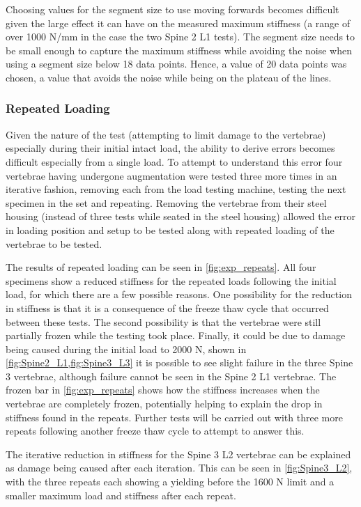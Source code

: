 Choosing values for the segment size to use moving forwards becomes difficult
given the large effect it can have on the measured maximum stiffness (a range of
over 1000 N/mm in the case the two Spine 2 L1 tests). The segment size needs to
be small enough to capture the maximum stiffness while avoiding the noise when
using a segment size below 18 data points. Hence, a value of 20 data points was
chosen, a value that avoids the noise while being on the plateau of the lines.


\subsubsection{Repeated Loading}

Given the nature of the test (attempting to limit damage to the vertebrae)
especially during their initial intact load, the ability to derive errors
becomes difficult especially from a single load. To attempt to understand this
error four vertebrae having undergone augmentation were tested three more times
in an iterative fashion, removing each from the load testing machine, testing
the next specimen in the set and repeating. Removing the vertebrae from their
steel housing (instead of three tests while seated in the steel housing) allowed
the error in loading position and setup to be tested along with repeated loading
of the vertebrae to be tested.

The results of repeated loading can be seen in \cref{fig:exp_repeats}. All
four specimens show a reduced stiffness for the repeated loads following the
initial load, for which there are a few possible reasons. One possibility for
the reduction in stiffness is that it is a consequence of the freeze thaw cycle
that occurred between these tests. The second possibility is that the vertebrae
were still partially frozen while the testing took place. Finally, it could be
due to damage being caused during the initial load to 2000 N, shown in \cref{fig:Spine2_L1,fig:Spine3_L3} it is possible to see slight failure
in the three Spine 3 vertebrae, although failure cannot be seen in the Spine 2 L1
vertebrae. The frozen bar in \cref{fig:exp_repeats} shows how the
stiffness increases when the vertebrae are completely frozen, potentially
helping to explain the drop in stiffness found in the repeats. Further tests
will be carried out with three more repeats following another freeze thaw cycle
to attempt to answer this.

The iterative reduction in stiffness for the Spine 3 L2 vertebrae can be
explained as damage being caused after each iteration. This can be seen in
\cref{fig:Spine3_L2}, with the three repeats each showing a yielding
before the 1600 N limit and a smaller maximum load and stiffness after each
repeat.

